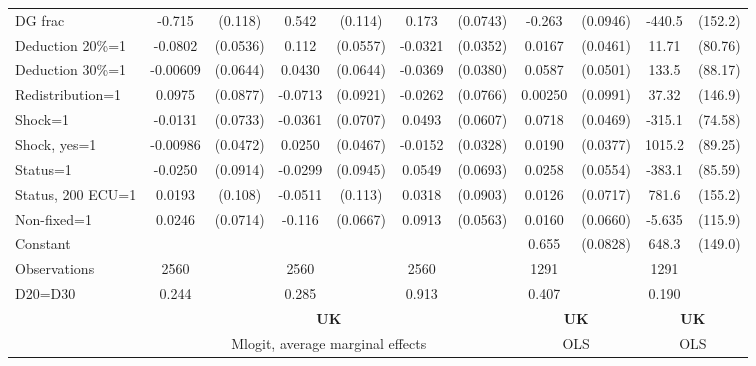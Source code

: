 \begin{tabular}{l|cccccc|cc|cc}
DG frac         &   -0.715\sym{***}&  (0.118)&    0.542\sym{***}&  (0.114)&    0.173\sym{**} & (0.0743)&   -0.263\sym{***}& (0.0946)&   -440.5\sym{***}&  (152.2)\\
Deduction 20\%=1&  -0.0802         & (0.0536)&    0.112\sym{**} & (0.0557)&  -0.0321         & (0.0352)&   0.0167         & (0.0461)&    11.71         &  (80.76)\\
Deduction 30\%=1& -0.00609         & (0.0644)&   0.0430         & (0.0644)&  -0.0369         & (0.0380)&   0.0587         & (0.0501)&    133.5         &  (88.17)\\
Redistribution=1&   0.0975         & (0.0877)&  -0.0713         & (0.0921)&  -0.0262         & (0.0766)&  0.00250         & (0.0991)&    37.32         &  (146.9)\\
Shock=1         &  -0.0131         & (0.0733)&  -0.0361         & (0.0707)&   0.0493         & (0.0607)&   0.0718         & (0.0469)&   -315.1\sym{***}&  (74.58)\\
Shock, yes=1    & -0.00986         & (0.0472)&   0.0250         & (0.0467)&  -0.0152         & (0.0328)&   0.0190         & (0.0377)&   1015.2\sym{***}&  (89.25)\\
Status=1        &  -0.0250         & (0.0914)&  -0.0299         & (0.0945)&   0.0549         & (0.0693)&   0.0258         & (0.0554)&   -383.1\sym{***}&  (85.59)\\
Status, 200 ECU=1&   0.0193         &  (0.108)&  -0.0511         &  (0.113)&   0.0318         & (0.0903)&   0.0126         & (0.0717)&    781.6\sym{***}&  (155.2)\\
Non-fixed=1     &   0.0246         & (0.0714)&   -0.116\sym{*}  & (0.0667)&   0.0913         & (0.0563)&   0.0160         & (0.0660)&   -5.635         &  (115.9)\\
Constant        &                  &         &                  &         &                  &         &    0.655\sym{***}& (0.0828)&    648.3\sym{***}&  (149.0)\\
\hline
Observations    &     2560         &         &     2560         &         &     2560         &         &     1291         &         &     1291         &         \\
D20=D30         &    0.244         &         &    0.285         &         &    0.913         &         &    0.407         &         &    0.190         &         \\
\hline\hline
&\multicolumn{6}{c|}{\bf UK}&\multicolumn{2}{c|}{\bf UK}&\multicolumn{2}{c}{\bf UK}\\ &\multicolumn{6}{c|}{Mlogit, average marginal effects }&\multicolumn{2}{c|}{OLS}&\multicolumn{2}{c}{OLS}\\

\end{tabular}
